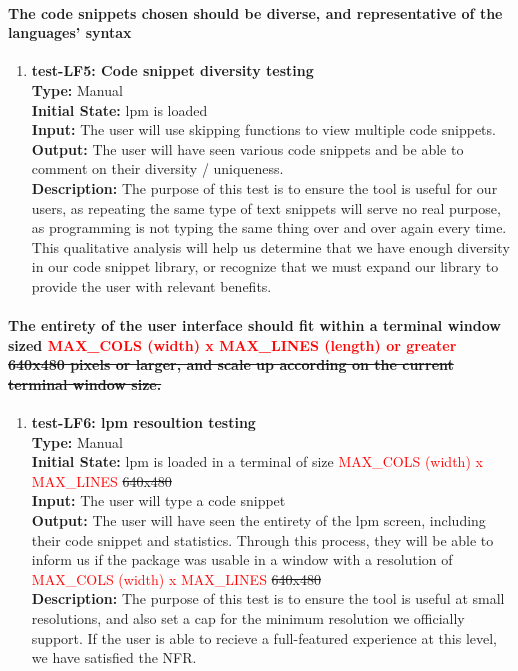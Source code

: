 \documentclass[12pt, titlepage]{article}
\begin{document}
\paragraph{The code snippets chosen should be diverse, and representative of the languages’ syntax}
\begin{enumerate}
    \item{\textbf{test-LF5: Code snippet diversity testing}\\}
    \textbf{Type:} Manual\\
    \textbf{Initial State:}  lpm is loaded\\
    \textbf{Input:} The user will use skipping functions to view multiple code snippets.\\
    \textbf{Output:} The user will have seen various code snippets and be able to comment on their diversity / uniqueness. \\
    \textbf{Description:}  The purpose of this test is to ensure the tool is useful for our users, as repeating the same type of text snippets will serve no real purpose, as programming is not typing the same thing over and over again every time. This qualitative analysis will help us determine that we have enough diversity in our code snippet library, or recognize that we must expand our library to provide the user with relevant benefits.\\
\end{enumerate}

\paragraph{The entirety of the user interface should fit within a terminal window sized \textcolor{red}{MAX\_COLS (width) x MAX\_LINES (length) or greater} \sout{640x480 pixels or larger, and scale up according on the current terminal window size.}}
\begin{enumerate}
    \item{\textbf{test-LF6: lpm resoultion testing}\\}
    \textbf{Type:} Manual\\
    \textbf{Initial State:}  lpm is loaded in a terminal of size \textcolor{red}{MAX\_COLS (width) x MAX\_LINES} \sout{640x480}\\
    \textbf{Input:} The user will type a code snippet\\
    \textbf{Output:} The user will have seen the entirety of the lpm screen, including their code snippet and statistics. Through this process, they will be able to inform us if the package was usable in a window with a resolution of \textcolor{red}{MAX\_COLS (width) x MAX\_LINES} \sout{640x480} \\
    \textbf{Description:}  The purpose of this test is to ensure the tool is useful at small resolutions, and also set a cap for the minimum resolution we officially support. If the user is able to recieve a full-featured experience at this level, we have satisfied the NFR. \\
\end{enumerate}
\end{document}
